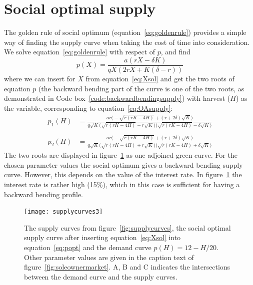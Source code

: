 \documentclass[11pt,fleqn]{book} %
\begin{document}
\section{Social optimal supply}
The golden rule of social optimum (equation~\ref{eq:goldenrule}) provides a simple way of finding the supply curve when taking the cost of time into consideration. We solve equation~\ref{eq:goldenrule} with respect of $p$, and find
\begin{equation} 
\label{eq:popt}
p(X) = \frac{a (r X - \delta K)}{q X ( 2 r X + K ( \delta - r))}
\end{equation}
where we can insert for $X$ from equation~\ref{eq:Xsol} and get the two roots of equation $p$ (the backward bending part of the curve is one of the two roots, as demonstrated in Code box~\ref{code:backwardbendingsupply}) with harvest ($H$) as the variable, corresponding to equation~\ref{eq:OAsupply}:
\begin{equation} 
\label{eq:psol}
\begin{aligned}
p_1(H) &= \frac{a r \Big(-\sqrt{r (r K - 4 H)} + (r + 2 \delta) \sqrt{K} \Big)}{q \sqrt{K} \Big(\sqrt{r (r K - 4 H)} - r \sqrt{K} \Big) \Big(\sqrt{r (r K - 4 H)} - \delta \sqrt{K} \Big)} \\\\
p_2(H) &= \frac{a r \Big(-\sqrt{r (r K - 4 H)} + (r + 2 \delta) \sqrt{K} \Big)}{q \sqrt{K} \Big(\sqrt{r (r K - 4 H)} + r \sqrt{K} \Big) \Big(\sqrt{r (r K - 4 H)} + \delta \sqrt{K} \Big)}
\end{aligned}
\end{equation}
The two roots are displayed in figure~\ref{fig:supplycurves2} as one adjoined green curve. For the chosen parameter values the social optimum gives a backward bending supply curve. However, this depends on the value of the interest rate. In figure~\ref{fig:supplycurves2} the interest rate is rather high (15\%), which in this case is sufficient for having a backward bending profile.

\begin{figure}[ht]
\centering
\texttt{[image: supplycurves3]}
\caption{The supply curves from figure~\ref{fig:supplycurves}, the social optimal supply curve after inserting equation~\ref{eq:Xsol} into equation~\ref{eq:popt} and the demand curve $p(H) = 12 - H/20$. Other parameter values are given in the caption text of figure~\ref{fig:soleownermarket}. A, B and C indicates the intersections between the demand curve and the supply curves.} 
\label{fig:supplycurves2}
\end{figure}
\end{document}
